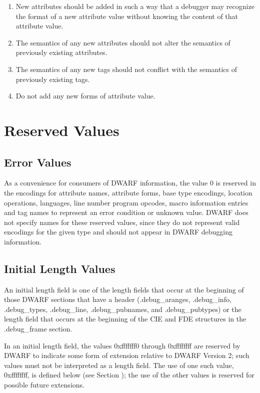 \begin{enumerate}[1.]
\item New attributes should be added in such a way that a
debugger may recognize the format of a new attribute value
without knowing the content of that attribute value.

\item The semantics of any new attributes should not alter
the semantics of previously existing attributes.

\item The semantics of any new tags should not conflict with
the semantics of previously existing tags.

\item Do not add any new forms of attribute value.

\end{enumerate}


\section{Reserved Values}
\label{datarep:reservedvalues}
\subsection{Error Values}
\label{datarep:errorvalues}

As a convenience for consumers of DWARF information, the value
0 is reserved in the encodings for attribute names, attribute
forms, base type encodings, location operations, languages,
line number program opcodes, macro information entries and tag
names to represent an error condition or unknown value. DWARF
does not specify names for these reserved values, since they
do not represent valid encodings for the given type and should
not appear in DWARF debugging information.


\subsection{Initial Length Values}
\label{datarep:initiallengthvalues}

An initial length field is one of the length fields that occur
at the beginning of those DWARF sections that have a header
(.debug\_aranges, .debug\_info, .debug\_types, .debug\_line,
.debug\_pubnames, and .debug\_pubtypes) or the length field
that occurs at the beginning of the CIE and FDE structures
in the .debug\_frame section.

In an initial length field, the values 0xfffffff0 through
0xffffffff are reserved by DWARF to indicate some form of
extension relative to DWARF Version 2; such values must not
be interpreted as a length field. The use of one such value,
0xffffffff, is defined below 
(see Section ); 
the use of
the other values is reserved for possible future extensions.




